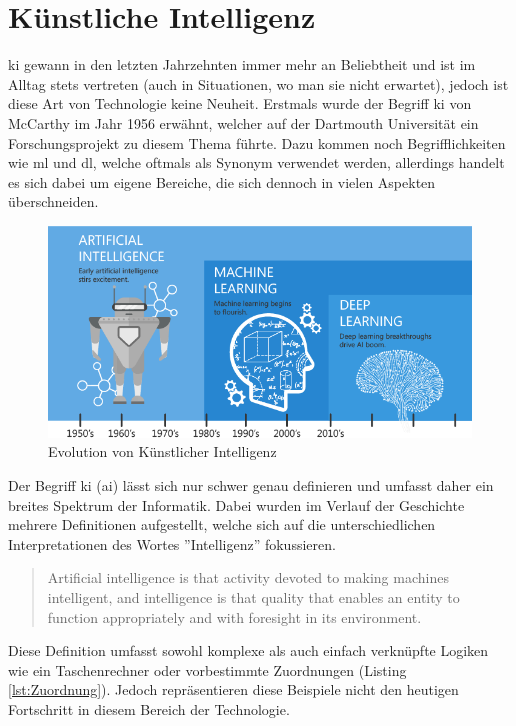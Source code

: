 \section{Künstliche Intelligenz}

\gls{ki} gewann in den letzten Jahrzehnten immer mehr an Beliebtheit und ist im Alltag stets vertreten (auch in Situationen, wo man sie nicht erwartet), jedoch ist diese Art von Technologie keine Neuheit. Erstmals wurde der Begriff \Gls{ki} von McCarthy im Jahr 1956 erwähnt, welcher auf der Dartmouth Universität ein Forschungsprojekt zu diesem Thema führte. \cite{100YAI} Dazu kommen noch Begrifflichkeiten wie \gls{ml} und \gls{dl}, welche oftmals als Synonym verwendet werden, allerdings handelt es sich dabei um eigene Bereiche, die sich dennoch in vielen Aspekten überschneiden.

\begin{figure}[H]
    \centering
    \includegraphics[scale=0.55]{sections/machine-learning/images/ki-ml-dl.png}
    \caption{Evolution von Künstlicher Intelligenz}
\end{figure}

Der Begriff \gls{ki} (\gls{ai}) lässt sich nur schwer genau definieren und umfasst daher ein breites Spektrum der Informatik. Dabei wurden im Verlauf der Geschichte mehrere Definitionen aufgestellt, welche sich auf die unterschiedlichen Interpretationen des Wortes ''Intelligenz'' fokussieren.

\begin{quote}
    Artificial intelligence is that activity devoted to making machines intelligent,
    and intelligence is that quality that enables an entity to function appropriately
    and with foresight in its environment. \cite{TQFAI}
\end{quote}

Diese Definition umfasst sowohl komplexe als auch einfach verknüpfte Logiken wie ein Taschenrechner oder vorbestimmte Zuordnungen (Listing \ref{lst:Zuordnung}). Jedoch repräsentieren diese Beispiele nicht den heutigen Fortschritt in diesem Bereich der Technologie.

